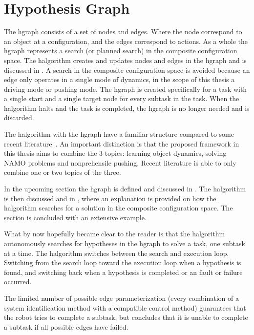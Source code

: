 \section{Hypothesis Graph}%
\label{sec:hgraph}
The \acf{hgraph} consists of a set of nodes and edges. Where the node correspond to an object at a configuration, and the edges correspond to actions. As a whole the \ac{hgraph} represents a search (or planned search) in the composite configuration space. The \ac{halgorithm} creates and updates nodes and edges in the \ac{hgraph} and is discussed in . A search in the composite configuration space is avoided because an edge only operates in a single mode of dynamics, in the scope of this thesis a driving mode or pushing mode. The \ac{hgraph} is created specifically for a task with a single start and a single target node for every subtask in the task. When the \ac{halgorithm} halts and the task is completed, the \ac{hgraph} is no longer needed and is discarded.\bs

The \ac{halgorithm} with the \ac{hgraph} have a familiar structure compared to some recent literature~\cite{ellis_navigation_2022,wang_affordancebased_2020}. An important distinction is that the proposed framework in this thesis aims to combine the 3 topics: learning object dynamics, solving \ac{NAMO} problems and nonprehensile pushing. Recent literature is able to only combine one or two topics of the three.\bs

In the upcoming section the \ac{hgraph} is defined and discussed in . The \ac{halgorithm} is then discussed and in , where an explanation is provided on how the \ac{halgorithm} searches for a solution in the composite configuration space. The section is concluded with an extensive example.\bs





What by now hopefully became clear to the reader is that the \ac{halgorithm} autonomously searches for hypotheses in the \ac{hgraph} to solve a task, one subtask at a time. The \ac{halgorithm} switches between the search and execution loop. Switching from the search loop toward the execution loop when a hypothesis is found, and switching back when a hypothesis is completed or an fault or failure occurred.\bs

The limited number of possible edge parameterization (every combination of a system identification method with a compatible control method) guarantees that the robot tries to complete a subtask, but concludes that it is unable to complete a subtask if all possible edges have failed.\bs

